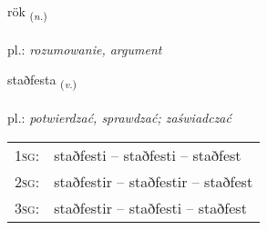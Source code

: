 \documentclass[frontgrid, backgrid]{flacards}\usepackage[]{graphicx}\usepackage[]{xcolor}
\begin{document}
\renewcommand{\flhead}{\vskip5pt \fboxsep=0pt {\small\bfseries\footnotesize Nafnorð | rzeczownik}}
\renewcommand{\fcfoot}{\vskip5pt \fboxsep=0pt \hspace{2pt}{\small\bfseries\footnotesize 1K}}

\renewcommand{\blhead}{\vskip5pt {\small\bfseries\footnotesize Nafnorð | rzeczownik }}
\renewcommand{\bcfoot}{\vskip5pt \hspace{2pt}{\small\bfseries\footnotesize 1K}}


{rök \small{\textsubscript{(\textit{n.})}} \\[1ex] %
\textphonetic{[rœːk]} \\
pl.: \emph{rozumowanie, argument} \\  [2ex]
\renewcommand*{\arraystretch}{0.8}
}

\renewcommand{\flhead}{\vskip5pt \fboxsep=0pt {\small\bfseries\footnotesize Sagnorð | czasownik}}
\renewcommand{\fcfoot}{\vskip5pt \fboxsep=0pt \hspace{2pt}{\small\bfseries\footnotesize 1K}}

\renewcommand{\blhead}{\vskip5pt {\small\bfseries\footnotesize Sagnorð | czasownik }}
\renewcommand{\bcfoot}{\vskip5pt \hspace{2pt}{\small\bfseries\footnotesize 1K}}


{staðfesta \small{\textsubscript{(\textit{v.})}} \\[1ex] %
\textphonetic{[staðfɛsta]} \\
pl.: \emph{potwierdzać, sprawdzać; zaświadczać} \\  [2ex]
\renewcommand*{\arraystretch}{0.8}
\begin{tabular}{p{1cm}l}
\textsc{1sg}: & staðfesti -- staðfesti -- staðfest \\ 
\textsc{2sg}: & staðfestir -- staðfestir -- staðfest \\ 
\textsc{3sg}: & staðfestir -- staðfesti -- staðfest \\ 
\end{tabular}
}
\end{document}
